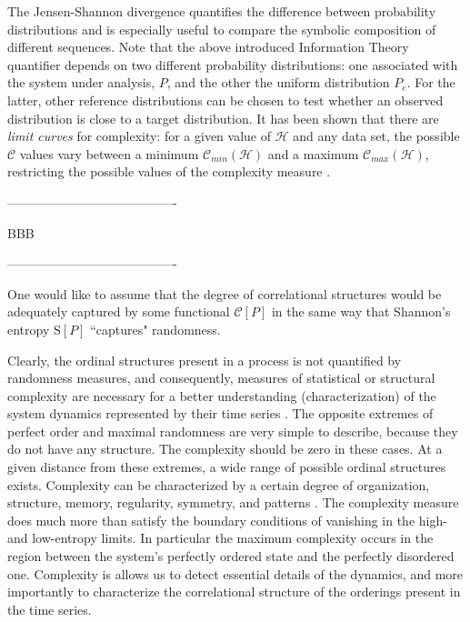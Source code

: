 The Jensen-Shannon divergence quantifies the difference between probability distributions and 
is especially useful to compare the symbolic composition of different sequences\cite{Grosse2002}.
Note that the above introduced Information Theory quantifier depends on two different probability distributions: one associated with the system under analysis, $P$, and the other the uniform distribution $P_e$. For the latter, other reference distributions can be chosen to test whether an observed distribution is close to a target distribution.
It has been shown that there are \textit{limit curves} for complexity: for a given value of ${\mathcal H}$ and any data set, the possible ${\mathcal C}$ 
values vary between a minimum ${\mathcal C}_{min}({\mathcal H})$ and a maximum ${\mathcal C}_{max}({\mathcal H})$, 
restricting the possible values of the complexity measure \cite{Martin2006}.

----------------------------------------

BBB

----------------------------------------



One would like to assume that the degree of correlational structures would be adequately captured
by some functional ${\mathcal C} [P]$ in the same way that Shannon's entropy ${\mathrm S}[P]$ 
\cite{Shannon1948} ``captures" randomness.

Clearly, the ordinal structures present in a process is not quantified by randomness measures, 
and consequently, measures of statistical or structural complexity are necessary for a better understanding 
(characterization) of the system dynamics represented by their time series \cite{Crutchfield1998}. 
The opposite extremes of perfect order and maximal randomness are very simple to describe, because they do 
not have any structure. 
The complexity should be zero in these cases. 
At a given distance from these extremes, a wide range of possible ordinal structures exists. 
Complexity can be characterized by a certain degree of organization, structure, memory, regularity, symmetry, 
and patterns \cite{Feldman2008}. 
The complexity measure does much more than satisfy the boundary conditions of vanishing in the high- and 
low-entropy limits. 
In particular the maximum complexity occurs in the region between the system's perfectly ordered state and 
the perfectly disordered one. 
Complexity is allows us to detect essential details of the dynamics, and more importantly to characterize 
the correlational structure of the orderings present in the time series.

